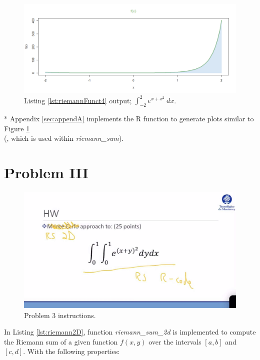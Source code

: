 \documentclass[11pt,a4paper]{article}
\begin{document}
\begin{figure}[!h]
\centering
\includegraphics[width=\textwidth]{./img/ExpOfxplusxsqr.png}
\caption{Listing \ref{lst:riemannFunct4} output; $ \int_{-2}^{2} e^{x+x^2} \ dx $.\label{fig:plotArea}}
\end{figure}

* Appendix \ref{sec:appendA} implements the R function to generate plots similar to Figure \ref{fig:plotArea} \\ (, which is used within \emph{riemann\_sum}).

\clearpage

\section{Problem III}\label{sec:p3}

\begin{figure}[!h]
\centering
\includegraphics[width=\textwidth]{./img/instructionsP3.jpg}
\caption{Problem 3 instructions.\label{fig:P3inst}}
\end{figure}

In Listing \ref{lst:riemann2D}, function \emph{riemann\_sum\_2d} is implemented to compute the Riemann sum of a given function $ f(x,y) $ over the intervals $ [a,b] $ and $ [c,d] $. With the following properties:\\
\end{document}

